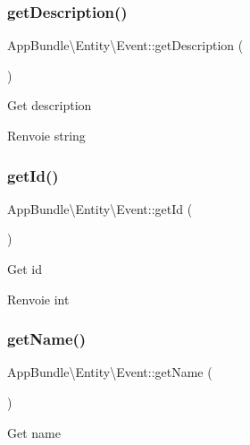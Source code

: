 \subsubsection{\texorpdfstring{get\+Description()}{getDescription()}}
{\footnotesize\ttfamily App\+Bundle\textbackslash{}\+Entity\textbackslash{}\+Event\+::get\+Description (\begin{DoxyParamCaption}{ }\end{DoxyParamCaption})}

Get description

\begin{DoxyReturn}{Renvoie}
string 
\end{DoxyReturn}
\mbox{\label{classAppBundle_1_1Entity_1_1Event_a6114bdcf3b095f77e8149d7b996c4d6d}} 
\subsubsection{\texorpdfstring{get\+Id()}{getId()}}
{\footnotesize\ttfamily App\+Bundle\textbackslash{}\+Entity\textbackslash{}\+Event\+::get\+Id (\begin{DoxyParamCaption}{ }\end{DoxyParamCaption})}

Get id

\begin{DoxyReturn}{Renvoie}
int 
\end{DoxyReturn}
\mbox{\label{classAppBundle_1_1Entity_1_1Event_a342d43c67caedb66f9a0f87a0edf5e11}} 
\subsubsection{\texorpdfstring{get\+Name()}{getName()}}
{\footnotesize\ttfamily App\+Bundle\textbackslash{}\+Entity\textbackslash{}\+Event\+::get\+Name (\begin{DoxyParamCaption}{ }\end{DoxyParamCaption})}

Get name

